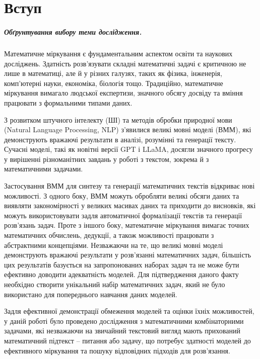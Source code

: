 \chapter*{Вступ}

\paragraph{Обґрунтування вибору теми дослідження.}

Математичне міркування є фундаментальним аспектом освіти та наукових досліджень. Здатність розв'язувати складні математичні задачі є критичною не лише в математиці, але й у різних галузях, таких як фізика, інженерія, комп'ютерні науки, економіка, біологія тощо. Традиційно, математичне міркування вимагало людської експертизи, значного обсягу досвіду та вміння працювати з формальними типами даних.

З розвитком штучного інтелекту (ШІ) та методів обробки природної мови (Natural Language Processing, NLP) з’явилися великі мовні моделі (ВММ), які демонструють вражаючі результати в аналізі, розумінні та генерації тексту. Сучасні моделі, такі як новітні версії GPT і LLaMA, досягли значного прогресу у вирішенні різноманітних завдань у роботі з текстом, зокрема й з математичними задачами.

Застосування ВММ для синтезу та генерації математичних текстів відкриває нові можливості. З одного боку, ВММ можуть обробляти великі обсяги даних та виявляти закономірності у великих масивах даних та приходити до висновків, які можуть використовувати задля автоматичної формалізації текстів та генерації розв'язань задач. Проте з іншого боку, математичне міркування вимагає точних математичних обчислень, дедукції, а також можливості працювати з абстрактними концепціями. Незважаючи на те, що великі мовні моделі демонструють вражаючі результати у розв'язанні математичних задач, більшість цих результатів базується на запропонованих наборах задач та не може бути ефективно доводити адекватність моделей. Для підтвердження даного факту необхідно створити унікальний набір математичних задач, який не було використано для попереднього навчання даних моделей.

Задля ефективної демонстрації обмеження моделей та оцінки їхніх можливостей, у даній роботі було проведено дослідження з математичними комбінаторними задачами, які незважаючи на звичайний текстовий вигляд мають прихований математичний підтекст -- питання або задачу, що потребує здатності моделей до ефективного міркування та пошуку відповідних підходів для розв'язання.

